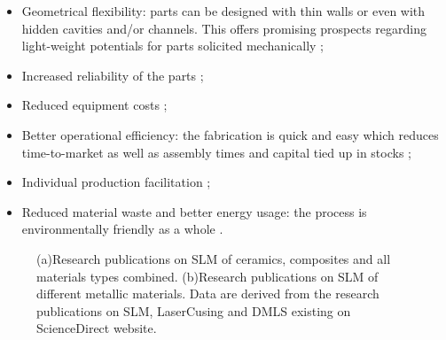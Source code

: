 \begin{itemize}
\item Geometrical flexibility: parts can be designed with thin walls or even with hidden cavities and/or channels. This offers promising prospects regarding light-weight potentials for parts solicited mechanically \parencite{Lippert};
\item Increased reliability of the parts \parencite{Haase};
\item Reduced equipment costs \parencite{Hoeges};
\item Better operational efficiency: the fabrication is quick and easy which reduces time-to-market as well as assembly times and capital tied up in stocks \parencite{Hoeges};
\item Individual production facilitation \parencite{Haase};
\item Reduced material waste and better energy usage: the process is  environmentally friendly as a whole \parencite{Haase}.
\end{itemize}

\begin{figure}[th]
\centering
\noindent{}
\decoRule

\caption[(a)Research publications on SLM of ceramics, composites and all materials types combined. (b)Research publications on SLM of different metallic materials]{(a)Research publications on SLM of ceramics, composites and all materials types combined. (b)Research publications on SLM of different metallic materials. Data are derived from the research publications on SLM, LaserCusing and DMLS existing on ScienceDirect website.}
\label{fig:Evol}
\end{figure}

